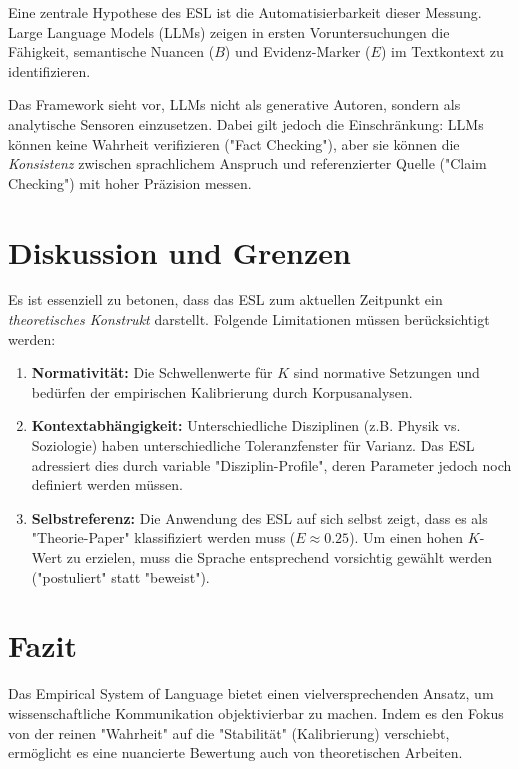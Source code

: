 \documentclass[11pt, a4paper]{article}
\begin{document}
Eine zentrale Hypothese des ESL ist die Automatisierbarkeit dieser Messung. Large Language Models (LLMs) zeigen in ersten Voruntersuchungen die Fähigkeit, semantische Nuancen ($B$) und Evidenz-Marker ($E$) im Textkontext zu identifizieren.

Das Framework sieht vor, LLMs nicht als generative Autoren, sondern als analytische Sensoren einzusetzen. Dabei gilt jedoch die Einschränkung: LLMs können keine Wahrheit verifizieren ("Fact Checking"), aber sie können die \textit{Konsistenz} zwischen sprachlichem Anspruch und referenzierter Quelle ("Claim Checking") mit hoher Präzision messen.

\section{Diskussion und Grenzen}

Es ist essenziell zu betonen, dass das ESL zum aktuellen Zeitpunkt ein \textit{theoretisches Konstrukt} darstellt. Folgende Limitationen müssen berücksichtigt werden:

\begin{enumerate}
    \item \textbf{Normativität:} Die Schwellenwerte für $K$ sind normative Setzungen und bedürfen der empirischen Kalibrierung durch Korpusanalysen.
    \item \textbf{Kontextabhängigkeit:} Unterschiedliche Disziplinen (z.B. Physik vs. Soziologie) haben unterschiedliche Toleranzfenster für Varianz. Das ESL adressiert dies durch variable "Disziplin-Profile", deren Parameter jedoch noch definiert werden müssen.
    \item \textbf{Selbstreferenz:} Die Anwendung des ESL auf sich selbst zeigt, dass es als "Theorie-Paper" klassifiziert werden muss ($E \approx 0.25$). Um einen hohen $K$-Wert zu erzielen, muss die Sprache entsprechend vorsichtig gewählt werden ("postuliert" statt "beweist").
\end{enumerate}

\section{Fazit}

Das Empirical System of Language bietet einen vielversprechenden Ansatz, um wissenschaftliche Kommunikation objektivierbar zu machen. Indem es den Fokus von der reinen "Wahrheit" auf die "Stabilität" (Kalibrierung) verschiebt, ermöglicht es eine nuancierte Bewertung auch von theoretischen Arbeiten.
\end{document}
